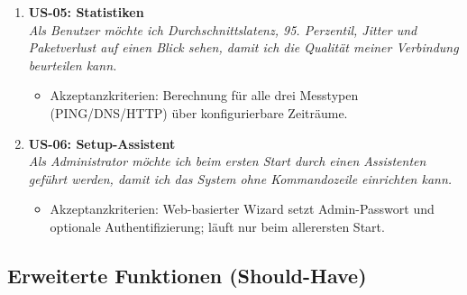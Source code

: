 \begin{enumerate}
  \item \textbf{US-05: Statistiken}\\
    \textit{Als Benutzer möchte ich Durchschnittslatenz, 95. Perzentil, Jitter und Paketverlust
    auf einen Blick sehen, damit ich die Qualität meiner Verbindung beurteilen kann.}
    \begin{itemize}
      \item Akzeptanzkriterien: Berechnung für alle drei Messtypen (PING/DNS/HTTP) über
        konfigurierbare Zeiträume.
    \end{itemize}

  \item \textbf{US-06: Setup-Assistent}\\
    \textit{Als Administrator möchte ich beim ersten Start durch einen Assistenten geführt
    werden, damit ich das System ohne Kommandozeile einrichten kann.}
    \begin{itemize}
      \item Akzeptanzkriterien: Web-basierter Wizard setzt Admin-Passwort und optionale
        Authentifizierung; läuft nur beim allerersten Start.
    \end{itemize}
\end{enumerate}

\subsection{Erweiterte Funktionen (Should-Have)}


